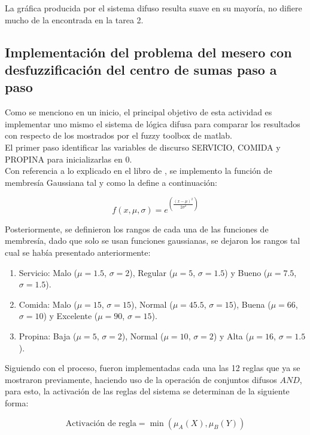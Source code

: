 \documentclass[11pt, letterpaper]{article}
\begin{document}
La gráfica producida por el sistema difuso resulta suave en su mayoría, no difiere mucho de la encontrada en la tarea 2. 

\newpage

\subsection{Implementación del problema del mesero con desfuzzificación del centro de sumas paso a paso}

Como se menciono en un inicio, el principal objetivo de esta actividad es implementar uno mismo el sistema de lógica difusa para comparar los resultados con respecto de los mostrados por el fuzzy toolbox de matlab.\\

El primer paso  identificar las variables de discurso SERVICIO, COMIDA y PROPINA para inicializarlas en 0.\\

Con referencia a lo explicado en el libro de \cite{Cisneros2004}, se implemento la función de membresía Gaussiana tal y como la define a continuación:

\[
f(x, \mu, \sigma) = e^{\left( \frac{(x - \mu)^2}{2\sigma^2} \right)}
\]

Posteriormente, se definieron los rangos de cada una de las funciones de membresía, dado que solo se usan funciones gaussianas, se dejaron los rangos tal cual se había presentado anteriormente:

\begin{enumerate}
	\item Servicio: Malo ($\mu = 1.5$, $\sigma = 2$), Regular ($\mu = 5$, $\sigma = 1.5$) y Bueno ($\mu = 7.5$, $\sigma = 1.5$).
	\item Comida: Malo ($\mu = 15$, $\sigma = 15$), Normal ($\mu = 45.5$, $\sigma = 15$), Buena ($\mu = 66$, $\sigma = 10$) y Excelente ($\mu = 90$, $\sigma = 15$).	
	\item Propina: Baja ($\mu = 5$, $\sigma = 2$), Normal ($\mu = 10$, $\sigma = 2$) y Alta ($\mu = 16$, $\sigma = 1.5$).

\end{enumerate} 


Siguiendo con el proceso, fueron implementadas cada una las 12 reglas que ya se mostraron previamente, haciendo uso de la operación de conjuntos difusos $AND$, para esto, la activación de las reglas del sistema se determinan de la siguiente forma:

\[
\text{Activación de regla}  = \min( \mu_A(X), \mu_B(Y) )
\]
\end{document}

